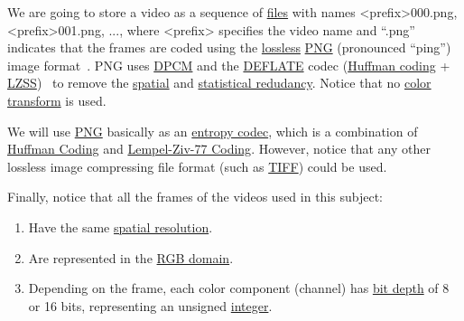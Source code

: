 We are going to store a video as a sequence of
\href{https://en.wikipedia.org/wiki/Computer_file}{files} with names
<prefix>000.png, <prefix>001.png, ..., where <prefix> specifies the
video name and ``.png'' indicates that the frames are coded using the
\href{https://en.wikipedia.org/wiki/Lossless_compression}{lossless}
\href{https://en.wikipedia.org/wiki/Portable_Network_Graphics}{PNG}
(pronounced ``ping'') image format~\cite{roelofs1999png}. PNG uses
\href{https://en.wikipedia.org/wiki/Differential_pulse-code_modulation}{DPCM}
and the \href{https://en.wikipedia.org/wiki/DEFLATE}{DEFLATE} codec
(\href{https://en.wikipedia.org/wiki/Huffman_coding}{Huffman coding} +
\href{https://en.wikipedia.org/wiki/Lempel-Ziv-Storer-Szymanski}{LZSS})~\cite{nelson96datacompression}
to remove the
\href{https://en.wikipedia.org/wiki/Image_compression}{spatial} and
\href{https://en.wikipedia.org/wiki/Data_compression}{statistical
  redudancy}. Notice that no
\href{https://en.wikipedia.org/wiki/YUV}{color transform} is used.

We will use \href{https://vicente-gonzalez-ruiz.github.io/PNG/}{PNG}
basically as an
\href{https://en.wikipedia.org/wiki/Entropy_encoding}{entropy codec},
which is a combination of
\href{https://vicente-gonzalez-ruiz.github.io/Huffman_coding/}{Huffman
  Coding} and
\href{https://vicente-gonzalez-ruiz.github.io/LZ77/}{Lempel-Ziv-77
  Coding}. However, notice that any other lossless image compressing
file format (such as \href{https://en.wikipedia.org/wiki/TIFF}{TIFF})
could be used.

Finally, notice that all the frames of the videos used in this
subject:
\begin{enumerate}
\item Have the same
  \href{https://en.wikipedia.org/wiki/Image_resolution}{spatial
    resolution}.
\item Are represented in the
  \href{https://en.wikipedia.org/wiki/RGB_color_model}{RGB domain}.
\item Depending on the frame, each color component (channel) has
  \href{https://en.wikipedia.org/wiki/Glossary_of_computer_graphics#bit_depth}{bit
    depth} of 8 or 16 bits, representing an unsigned
  \href{https://en.wikipedia.org/wiki/Integer_(computer_science)}{integer}.
\end{enumerate}
  
